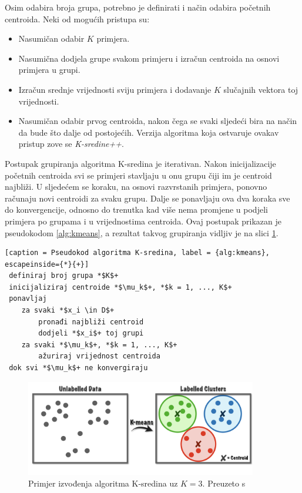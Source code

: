 \documentclass[utf8, diplomski, numeric]{fer}
\begin{document}
Osim odabira broja grupa, potrebno je definirati i način odabira početnih centroida. Neki od mogućih pristupa su:
\begin{itemize}
\item Nasumičan odabir $K$ primjera.
\item Nasumična dodjela grupe svakom primjeru i izračun centroida na osnovi primjera u grupi.
\item Izračun srednje vrijednosti sviju primjera i dodavanje $K$ slučajnih vektora toj vrijednosti.
\item Nasumičan odabir prvog centroida, nakon čega se svaki sljedeći bira na način da bude što dalje od postojećih. Verzija algoritma koja ostvaruje ovakav pristup zove se \textit{K-sredine++}.
\end{itemize}

Postupak grupiranja algoritma K-sredina je iterativan. Nakon inicijalizacije početnih centroida svi se primjeri stavljaju u onu grupu čiji im je centroid najbliži. U sljedećem se koraku, na osnovi razvrstanih primjera, ponovno računaju novi centroidi za svaku grupu. Dalje se ponavljaju ova dva koraka sve do konvergencije, odnosno do trenutka kad više nema promjene u podjeli primjera po grupama i u vrijednostima centroida. Ovaj postupak prikazan je pseudokodom \ref{alg:kmeans}, a rezultat takvog grupiranja vidljiv je na slici \ref{fig:kmeans}.

 \begin{lstlisting}[caption = Pseudokod algoritma K-sredina, label = {alg:kmeans}, escapeinside={*}{+}]
 definiraj broj grupa *$K$+
 inicijaliziraj centroide *$\mu_k$+, *$k = 1, ..., K$+
 ponavljaj
 	za svaki *$x_i \in D$+
 		pronađi najbliži centroid
 		dodjeli *$x_i$+ toj grupi
	za svaki *$\mu_k$+, *$k = 1, ..., K$+
		ažuriraj vrijednost centroida
 dok svi *$\mu_k$+ ne konvergiraju
\end{lstlisting}

\begin{figure}
\includegraphics[width=0.9\textwidth]{images/kmeans.png}
\centering
\caption{Primjer izvođenja algoritma K-sredina uz $K = 3$. Preuzeto s  \cite{kMeansUsingPython}}
\label{fig:kmeans}
\end{figure}
\end{document}
